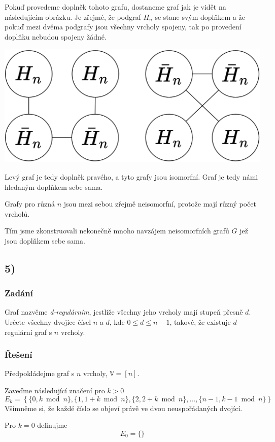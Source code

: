 \documentclass[../main.tex]{subfiles}
\begin{document}
Pokuď provedeme doplněk tohoto grafu, dostaneme graf jak je vidět na následujícím obrázku. Je zřejmé, že podgraf $H_n$ se stane svým doplňkem a že pokuď mezi dvěma podgrafy jsou všechny vrcholy spojeny, tak po provedení doplňku nebudou spojeny žádné.

\begin{center}
    \centering
    \includegraphics*[width=0.5\linewidth]{images/hw1-4.png}
\end{center}

Levý graf je tedy doplněk pravého, a tyto grafy jsou isomorfní. Graf je tedy námi hledaným doplňkem sebe sama. 

Grafy pro různá $n$ jsou mezi sebou zřejmě neisomorfní, protože mají různý počet vrcholů. 

Tím jsme zkonstruovali nekonečně mnoho navzájem neisomorfních grafů $G$ jež jsou doplňkem sebe sama.




\subsection{5)}
\subsubsection*{Zadání}
Graf nazvěme \textit{d-regulárním}, jestliže všechny jeho vrcholy mají stupeň přesně $d$. 
Určete všechny dvojice čísel $n$ a $d$, kde $0\leq d\leq n-1$, takové, že existuje $d$-regulární graf s $n$ vrcholy.
\subsubsection*{Řešení}
Předpokládejme graf s $n$ vrcholy, $\mathbb{V} = [n]$.

Zaveďme následující značení pro $k>0$
\begin{equation*}
    E_k = \left\{ \{ 0, k\bmod n \}, \{ 1, 1 + k\bmod n \}, \{ 2, 2+k\bmod n \}, ..., \{ n - 1, k - 1\bmod n \}\right\}
\end{equation*}
Všimněme si, že každé číslo se objeví právě ve dvou neuspořádaných dvojící.

Pro $k=0$ definujme
\begin{equation*}
    E_0 = \{\}
\end{equation*}
\end{document}
